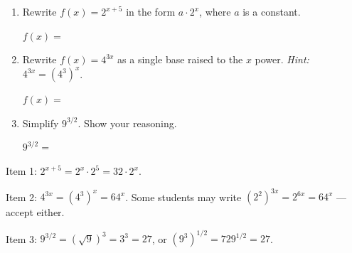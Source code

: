 \documentclass[10pt]{article}
\begin{document}
\namedateperiod

\vspace{0.12in}

\begin{enumerate}[itemsep=18pt]

\item Rewrite $f(x) = 2^{x+5}$ in the form $a \cdot 2^x$, where $a$ is a constant.

      \vspace{0.08in}
      $f(x) = $ 

\item Rewrite $f(x) = 4^{3x}$ as a single base raised to the $x$ power.
      \textit{Hint: } $4^{3x} = (4^3)^x$.

      \vspace{0.08in}
      $f(x) = $ 

\item Simplify $9^{3/2}$. Show your reasoning.

      \vspace{0.08in}
      $9^{3/2} = $ 

\end{enumerate}

\begin{teachernote}
Item 1: $2^{x+5} = 2^x \cdot 2^5 = 32 \cdot 2^x$.

Item 2: $4^{3x} = (4^3)^x = 64^x$. Some students may write $(2^2)^{3x} = 2^{6x} = 64^x$ --- accept either.

Item 3: $9^{3/2} = (\sqrt{9})^3 = 3^3 = 27$, or $(9^3)^{1/2} = 729^{1/2} = 27$.
\end{teachernote}
\end{document}
